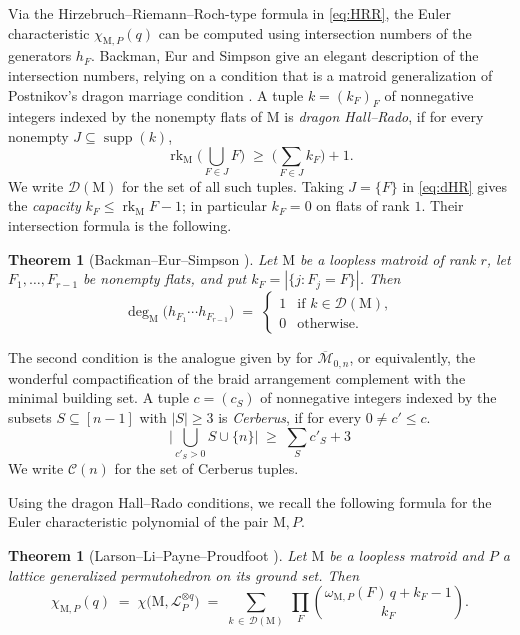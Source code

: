 \documentclass[11pt,a4paper,reqno]{amsart}
\theoremstyle{results}
\theoremstyle{definitions}
\newcommand{\rk}{\operatorname{rk}}
\newcommand{\M}{\mathrm{M}}
\newtheorem{theorem}[thm]{Theorem}
\DeclareMathOperator{\supp}{supp}
\newcommand{\cL}{\mathcal{L}}
\newcommand{\DHR}{\mathcal{D}}
\newcommand{\Cer}{\mathcal{C}}
\newcommand{\Mbar}{\overline{\mathcal M}}
\begin{document}
Via the Hirzebruch--Riemann--Roch-type formula in \eqref{eq:HRR}, the Euler characteristic $\chi_{\M, P}(q)$ can be computed using intersection numbers of the generators $h_F$.
Backman, Eur and
Simpson \cite[Proposition 5.2.3]{backman2024simplicial}  give an elegant description of the intersection numbers,
relying on a condition that is a matroid generalization of Postnikov's dragon marriage
condition \cite[\S 5, \S 9]{postnikov2009permutohedra}. A tuple $k = (k_F)_F$ of
nonnegative integers indexed by the nonempty flats of $\M$ is \emph{dragon
Hall--Rado}, if for every nonempty $J \subseteq \supp(k)$,
\begin{equation}\label{eq:dHR}
  \rk_{\M}\Big(\bigcup_{F \in J} F\Big) \;\geqslant\; \Big(\sum_{F \in J} k_F\Big) + 1
  \tag{dragon Hall--Rado}.
\end{equation}
We write $\DHR(\M)$ for the set of all such tuples.  Taking $J = \{F\}$ in
\eqref{eq:dHR} gives the \emph{capacity} $k_F \leqslant \rk_{\M} F - 1$; in particular
$k_F = 0$ on flats of rank $1$.  Their intersection formula is the following.

\begin{theorem}[Backman--Eur--Simpson {\cite[Theorem 5.2.4]{backman2024simplicial}}]\label{thm:bes-intersection}
  Let $\M$ be a loopless matroid of rank $r$, let $F_1,\ldots,F_{r-1}$
  be nonempty flats, and put $k_F=|\{j:F_j=F\}|$. Then
  \[
    \deg_{\M}\big( h_{F_1} \cdots h_{F_{r-1}} \big)
    \;=\;
    \begin{cases}
      1 & \text{if } k \in \DHR(\M), \\
      0 & \text{otherwise.}
    \end{cases}
  \]
\end{theorem}

The second condition is the analogue given by \cite[Theorem 9.1]{larson2024k} for
$\Mbar_{0,n}$, or equivalently, the wonderful compactification of the braid arrangement complement with the minimal building set. A
tuple $c = (c_S)$ of nonnegative integers indexed by the subsets
$S \subseteq [n-1]$ with $|S| \geqslant 3$ is \emph{Cerberus}, if for every $0\ne c' \leqslant c$.
\begin{equation}\label{eq:cerberus-cond}
 \Big|\bigcup_{c'_S > 0} S \cup \{n\}\Big|  \;\geqslant\;  \sum_{S} c'_S + 3 
  \tag{Cerberus}
\end{equation}
We write $\Cer(n)$ for the set of Cerberus tuples.

Using the dragon Hall--Rado conditions, we recall the following formula for the Euler characteristic polynomial of the pair $\M, P$.
\begin{theorem}[Larson--Li--Payne--Proudfoot {\cite[Corollary 7.5]{larson2024k}}]\label{thm:dhr}
  Let $\M$ be a loopless matroid and $P$ a lattice generalized permutohedron on
  its ground set.  Then
  \begin{equation}
    \label{eq:dhr}
    \chi_{\M,P}(q) \;=\; \chi\big(\M, \cL_{P}^{\otimes q}\big) \;=\;
    \sum_{k \,\in\, \DHR(\M)} \ \prod_{F} \binom{\omega_{\M, P}(F)\, q + k_F - 1}{k_F}.
  \end{equation}
\end{theorem}
\end{document}
